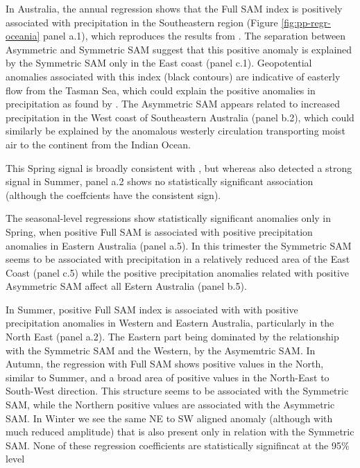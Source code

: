 \documentclass[]{ametsocV5}
\begin{document}
In Australia, the annual regression shows that the Full SAM index is
positively associated with precipitation in the Southeastern region
(Figure \ref{fig:pp-regr-oceania} panel a.1), which reproduces the
results from \citet{gillett2006}. The separation between Asymmetric and
Symmetric SAM suggest that this positive anomaly is explained by the
Symmetric SAM only in the East coast (panel c.1). Geopotential anomalies
associated with this index (black contours) are indicative of easterly
flow from the Tasman Sea, which could explain the positive anomalies in
precipitation as found by \citet{hendon2007}. The Asymmetric SAM appears
related to increased precipitation in the West coast of Southeastern
Australia (panel b.2), which could similarly be explained by the
anomalous westerly circulation transporting moist air to the continent
from the Indian Ocean.

This Spring signal is broadly consistent with \citet{hendon2007}, but
whereas \citet{hendon2007} also detected a strong signal in Summer,
panel a.2 shows no statistically significant association (although the
coeffcients have the consistent sign).

The seasonal-level regressions show statistically significant anomalies
only in Spring, when positive Full SAM is associated with positive
precipitation anomalies in Eastern Australia (panel a.5). In this
trimester the Symmetric SAM seems to be associated with precipitation in
a relatively reduced area of the East Coast (panel c.5) while the
positive precipitation anomalies related with positive Asymmetric SAM
affect all Estern Australia (panel b.5).

In Summer, positive Full SAM index is associated with with positive
precipitation anomalies in Western and Eastern Australia, particularly
in the North East (panel a.2). The Eastern part being dominated by the
relationship with the Symmetric SAM and the Western, by the Asymemtric
SAM. In Autumn, the regression with Full SAM shows positive values in
the North, similar to Summer, and a broad area of positive values in the
North-East to South-West direction. This structure seems to be
associated with the Symmetric SAM, while the Northern positive values
are associated with the Asymmetric SAM. In Winter we see the same NE to
SW aligned anomaly (although with much reduced amplitude) that is also
present only in relation with the Symmetric SAM. None of these
regression coefficients are statistically signifincat at the 95\% level
\end{document}
